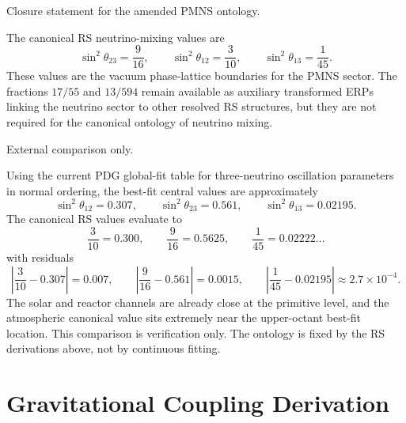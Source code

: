 \documentclass[11pt, letterpaper]{article}
\theoremstyle{definition}
\theoremstyle{plain}
\begin{document}
\begin{rsbox}
Closure statement for the amended PMNS ontology.

The canonical RS neutrino-mixing values are
\[
\sin^2\theta_{23} = \frac{9}{16}, \qquad
\sin^2\theta_{12} = \frac{3}{10}, \qquad
\sin^2\theta_{13} = \frac{1}{45}.
\]
These values are the vacuum phase-lattice boundaries for the PMNS sector.
The fractions $17/55$ and $13/594$ remain available as auxiliary transformed
ERPs linking the neutrino sector to other resolved RS structures, but they are
not required for the canonical ontology of neutrino mixing.
\end{rsbox}

\begin{verifybox}
External comparison only.

Using the current PDG global-fit table for three-neutrino oscillation
parameters in normal ordering, the best-fit central values are approximately
\[
\sin^2\theta_{12} = 0.307, \qquad
\sin^2\theta_{23} = 0.561, \qquad
\sin^2\theta_{13} = 0.02195.
\]
The canonical RS values evaluate to
\[
\frac{3}{10} = 0.300, \qquad
\frac{9}{16} = 0.5625, \qquad
\frac{1}{45} = 0.02222\ldots
\]
with residuals
\[
\left|\frac{3}{10} - 0.307\right| = 0.007,
\qquad
\left|\frac{9}{16} - 0.561\right| = 0.0015,
\qquad
\left|\frac{1}{45} - 0.02195\right| \approx 2.7\times 10^{-4}.
\]
The solar and reactor channels are already close at the primitive level, and
the atmospheric canonical value sits extremely near the upper-octant best-fit
location. This comparison is verification only. The ontology is fixed by the
RS derivations above, not by continuous fitting.
\end{verifybox}


\section{Gravitational Coupling Derivation}\label{sec:grav-coupling}
\end{document}
